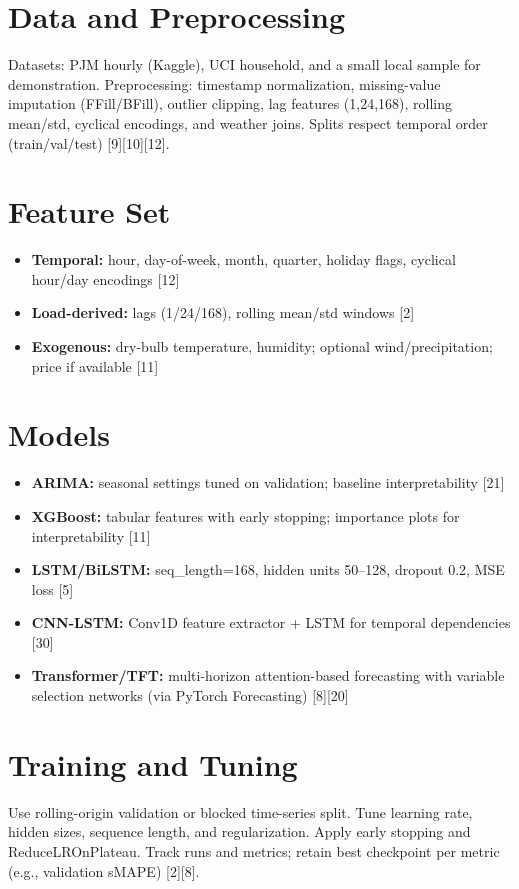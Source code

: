 \documentclass[12pt,a4paper]{report}
\begin{document}
\section{Data and Preprocessing}
Datasets: PJM hourly (Kaggle), UCI household, and a small local sample for demonstration. Preprocessing: timestamp normalization, missing-value imputation (FFill/BFill), outlier clipping, lag features (1,24,168), rolling mean/std, cyclical encodings, and weather joins. Splits respect temporal order (train/val/test) [9][10][12].

\section{Feature Set}
\begin{itemize}
\item \textbf{Temporal:} hour, day-of-week, month, quarter, holiday flags, cyclical hour/day encodings [12]
\item \textbf{Load-derived:} lags (1/24/168), rolling mean/std windows [2]
\item \textbf{Exogenous:} dry-bulb temperature, humidity; optional wind/precipitation; price if available [11]
\end{itemize}

\section{Models}
\begin{itemize}
\item \textbf{ARIMA:} seasonal settings tuned on validation; baseline interpretability [21]
\item \textbf{XGBoost:} tabular features with early stopping; importance plots for interpretability [11]
\item \textbf{LSTM/BiLSTM:} seq\_length=168, hidden units 50--128, dropout 0.2, MSE loss [5]
\item \textbf{CNN-LSTM:} Conv1D feature extractor + LSTM for temporal dependencies [30]
\item \textbf{Transformer/TFT:} multi-horizon attention-based forecasting with variable selection networks (via PyTorch Forecasting) [8][20]
\end{itemize}

\section{Training and Tuning}
Use rolling-origin validation or blocked time-series split. Tune learning rate, hidden sizes, sequence length, and regularization. Apply early stopping and ReduceLROnPlateau. Track runs and metrics; retain best checkpoint per metric (e.g., validation sMAPE) [2][8].
\end{document}
